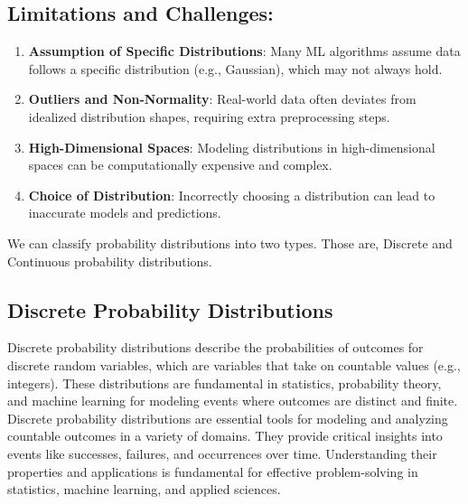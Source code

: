 \subsection*{Limitations and Challenges:}
\begin{enumerate}
    \item \textbf{Assumption of Specific Distributions}: Many ML algorithms assume data follows a specific distribution (e.g., Gaussian), which may not always hold.
    \item \textbf{Outliers and Non-Normality}: Real-world data often deviates from idealized distribution shapes, requiring extra preprocessing steps.
    \item \textbf{High-Dimensional Spaces}: Modeling distributions in high-dimensional spaces can be computationally expensive and complex.
    \item \textbf{Choice of Distribution}: Incorrectly choosing a distribution can lead to inaccurate models and predictions.
\end{enumerate}

We can classify probability distributions into two types. Those are, Discrete and Continuous probability distributions.

\subsection*{Discrete Probability Distributions}
Discrete probability distributions describe the probabilities of outcomes for discrete random variables, which are variables that take on countable values (e.g., integers). These distributions are fundamental in statistics, probability theory, and machine learning for modeling events where outcomes are distinct and finite. Discrete probability distributions are essential tools for modeling and analyzing countable outcomes in a variety of domains. They provide critical insights into events like successes, failures, and occurrences over time. Understanding their properties and applications is fundamental for effective problem-solving in statistics, machine learning, and applied sciences.

